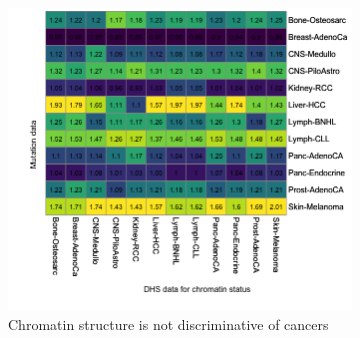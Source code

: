 \begin{figure}[ht!]
    \vspace{0.3cm}
    \begin{subfigure}{\textwidth}
    \centering
    \includegraphics[scale=0.52]{graphics/mixed_or_heatmap.png}
    \caption{Chromatin structure is not discriminative of cancers}
    \label{fig:mixed_or_heatmap}
    \end{subfigure} 
\caption{}
    \label{fig:mixed_or}
\end{figure}